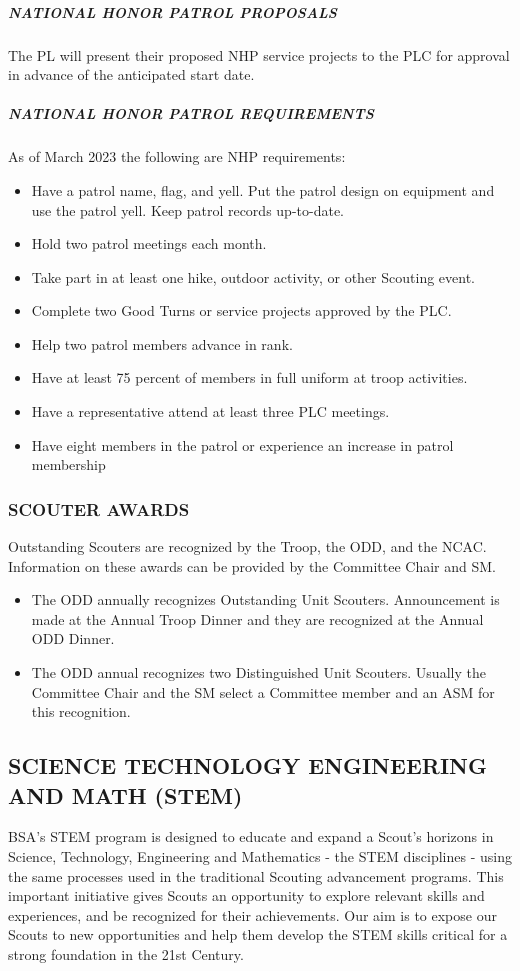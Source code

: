 \documentclass{ltxguide}
\begin{document}
\subparagraph{NATIONAL HONOR PATROL PROPOSALS}
The \ac{PL} will present their proposed NHP service projects to the \ac{PLC} for approval in advance of the anticipated start date.

\subparagraph{NATIONAL HONOR PATROL REQUIREMENTS}
As of March 2023 the following are NHP requirements:
\begin{itemize}
	\item Have a patrol name, flag, and yell. Put the patrol design on equipment and use the patrol yell. Keep patrol records up-to-date.
	\item Hold two patrol meetings each month.
	\item Take part in at least one hike, outdoor activity, or other Scouting event.
	\item Complete two Good Turns or service projects approved by the \ac{PLC}.
	\item Help two patrol members advance in rank.
	\item Have at least 75 percent of members in full uniform at troop activities.
	\item Have a representative attend at least three \ac{PLC} meetings.
	\item Have eight members in the patrol or experience an increase in patrol membership
\end{itemize}

\subsubsection{SCOUTER AWARDS}
Outstanding Scouters are recognized by the Troop, the \ac{ODD}, and the \ac{NCAC}. Information on these awards can be provided by the Committee Chair and \ac{SM}.
\begin{itemize}
	\item The \ac{ODD} annually recognizes Outstanding Unit Scouters. Announcement is made at the Annual Troop Dinner and they are recognized at the Annual \ac{ODD} Dinner.
	\item The \ac{ODD} annual recognizes two Distinguished Unit Scouters. Usually the Committee Chair and the SM select a Committee member and an ASM for this recognition.
\end{itemize}

\subsection{SCIENCE TECHNOLOGY ENGINEERING AND MATH (STEM)}
\ac{BSA}'s STEM program is designed to educate and expand a Scout's horizons in Science, Technology, Engineering and Mathematics - the STEM disciplines - using the same processes used in the traditional Scouting advancement programs. This important initiative gives Scouts an opportunity to explore relevant skills and experiences, and be recognized for their achievements. Our aim is to expose our Scouts to new opportunities and help them develop the STEM skills critical for a strong foundation in the 21st Century.
\end{document}
